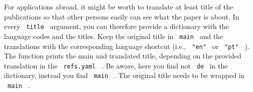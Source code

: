 \begin{Shaded}
\begin{Highlighting}[]
\KeywordTok{:}
\AttributeTok{  }\KeywordTok{:}\AttributeTok{ }
\AttributeTok{  }\KeywordTok{:}\AttributeTok{ }
\AttributeTok{  }\KeywordTok{:}
\AttributeTok{  }\KeywordTok{:}\AttributeTok{ }
\AttributeTok{  }\KeywordTok{:}\AttributeTok{ }
\AttributeTok{  }\KeywordTok{:}\AttributeTok{ }\KeywordTok{[}\AttributeTok{ }\KeywordTok{,}\AttributeTok{ }\AttributeTok{ }\KeywordTok{]}
\AttributeTok{  }\KeywordTok{:}\AttributeTok{ }
\AttributeTok{  }\KeywordTok{:}
\AttributeTok{    }\KeywordTok{:}\AttributeTok{ }
\AttributeTok{    }\KeywordTok{:}\AttributeTok{ }
\AttributeTok{    }\KeywordTok{:}\AttributeTok{ }
\AttributeTok{  }\KeywordTok{:}
\AttributeTok{    }\KeywordTok{:}\AttributeTok{ }
\end{Highlighting}
\end{Shaded}

For applications abroad, it might be worth to translate at least title
of the publications so that other persons easily can see what the paper
is about. In every \texttt{\ title\ } argument, you can therefore
provide a dictionary with the language codes and the titles. Keep the
original title in \texttt{\ main\ } and the translations with the
corresponding language shortcut (i.e., \texttt{\ "en"\ } or
\texttt{\ "pt"\ } ). The function prints the main and translated title,
depending on the provided translation in the \texttt{\ refs.yaml\ } . Be
aware, here you find not \texttt{\ de\ } in the dictionary, instead you
find \texttt{\ main\ } . The original title needs to be wrapped in
\texttt{\ main\ } .

